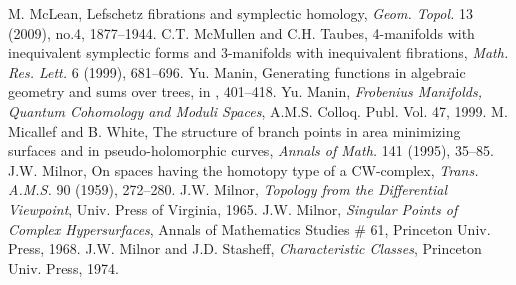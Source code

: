  M. McLean, Lefschetz fibrations and symplectic homology, \emph{Geom. Topol.} 13 (2009), no.4, 1877--1944.
 C.T. McMullen and C.H. Taubes, 4-manifolds with inequivalent symplectic forms and 3-manifolds with inequivalent fibrations, \emph{Math. Res. Lett.} 6 (1999), 681--696.
 Yu. Manin, Generating functions in algebraic geometry and sums over trees, in \cite{src-80}, 401--418.
 Yu. Manin, \emph{Frobenius Manifolds, Quantum Cohomology and Moduli Spaces}, A.M.S. Colloq. Publ. Vol. 47, 1999.
 M. Micallef and B. White, The structure of branch points in area minimizing surfaces and in pseudo-holomorphic curves, \emph{Annals of Math.} 141 (1995), 35--85.
 J.W. Milnor, On spaces having the homotopy type of a CW-complex, \emph{Trans. A.M.S.} 90 (1959), 272--280.
 J.W. Milnor, \emph{Topology from the Differential Viewpoint}, Univ. Press of Virginia, 1965.
 J.W. Milnor, \emph{Singular Points of Complex Hypersurfaces}, Annals of Mathematics Studies \# 61, Princeton Univ. Press, 1968.
 J.W. Milnor and J.D. Stasheff, \emph{Characteristic Classes}, Princeton Univ. Press, 1974.
